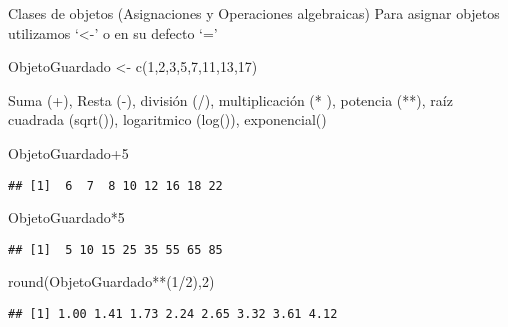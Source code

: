 \documentclass[
  10,
  ignorenonframetext,
]{beamer}
\newenvironment{Shaded}{\begin{snugshade}}{\end{snugshade}}
\newcommand{\DecValTok}[1]{\textcolor[rgb]{0.00,0.00,0.81}{#1}}
\newcommand{\FunctionTok}[1]{\textcolor[rgb]{0.00,0.00,0.00}{#1}}
\newcommand{\NormalTok}[1]{#1}
\newcommand{\OtherTok}[1]{\textcolor[rgb]{0.56,0.35,0.01}{#1}}
\newcommand{\SpecialCharTok}[1]{\textcolor[rgb]{0.00,0.00,0.00}{#1}}
\begin{document}
\begin{frame}[fragile]{Clases de objetos (Asignaciones y Operaciones
algebraicas)}
\protect\hypertarget{clases-de-objetos-asignaciones-y-operaciones-algebraicas}{}
Para asignar objetos utilizamos `\textless-' o en su defecto `='

\begin{Shaded}
\begin{Highlighting}[]
\NormalTok{ObjetoGuardado }\OtherTok{\textless{}{-}} \FunctionTok{c}\NormalTok{(}\DecValTok{1}\NormalTok{,}\DecValTok{2}\NormalTok{,}\DecValTok{3}\NormalTok{,}\DecValTok{5}\NormalTok{,}\DecValTok{7}\NormalTok{,}\DecValTok{11}\NormalTok{,}\DecValTok{13}\NormalTok{,}\DecValTok{17}\NormalTok{)}
\end{Highlighting}
\end{Shaded}

Suma (+), Resta (-), división (/), multiplicación (* ), potencia (**),
raíz cuadrada (sqrt()), logaritmico (log()), exponencial()

\begin{Shaded}
\begin{Highlighting}[]
\NormalTok{ObjetoGuardado}\SpecialCharTok{+}\DecValTok{5}
\end{Highlighting}
\end{Shaded}

\begin{verbatim}
## [1]  6  7  8 10 12 16 18 22
\end{verbatim}

\begin{Shaded}
\begin{Highlighting}[]
\NormalTok{ObjetoGuardado}\SpecialCharTok{*}\DecValTok{5}
\end{Highlighting}
\end{Shaded}

\begin{verbatim}
## [1]  5 10 15 25 35 55 65 85
\end{verbatim}

\begin{Shaded}
\begin{Highlighting}[]
\FunctionTok{round}\NormalTok{(ObjetoGuardado}\SpecialCharTok{**}\NormalTok{(}\DecValTok{1}\SpecialCharTok{/}\DecValTok{2}\NormalTok{),}\DecValTok{2}\NormalTok{)}
\end{Highlighting}
\end{Shaded}

\begin{verbatim}
## [1] 1.00 1.41 1.73 2.24 2.65 3.32 3.61 4.12
\end{verbatim}
\end{frame}
\end{document}
